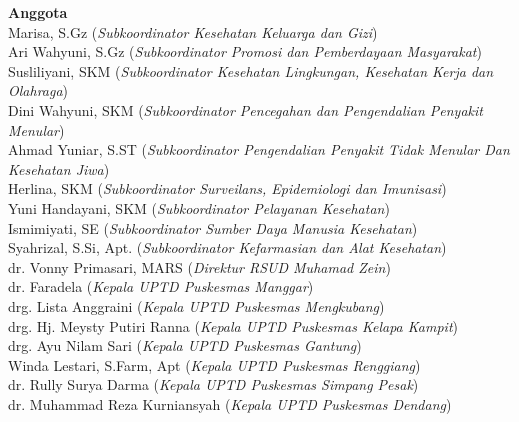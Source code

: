 {\textbf{Anggota}\\
\smallskip
Marisa, S.Gz (\emph{Subkoordinator Kesehatan Keluarga dan Gizi})\\
\smallskip
Ari Wahyuni, S.Gz (\emph{Subkoordinator Promosi dan Pemberdayaan Masyarakat})\\
\smallskip
Susliliyani, SKM (\emph{Subkoordinator Kesehatan Lingkungan, Kesehatan Kerja dan Olahraga})\\
\smallskip
Dini Wahyuni, SKM (\emph{Subkoordinator Pencegahan dan Pengendalian Penyakit Menular})\\
\smallskip
Ahmad Yuniar, S.ST (\emph{Subkoordinator Pengendalian Penyakit Tidak Menular Dan Kesehatan Jiwa})\\
\smallskip
Herlina, SKM (\emph{Subkoordinator Surveilans, Epidemiologi dan Imunisasi})\\
\smallskip
Yuni Handayani, SKM (\emph{Subkoordinator Pelayanan Kesehatan})\\
\smallskip
Ismimiyati, SE (\emph{Subkoordinator Sumber Daya Manusia Kesehatan})\\
\smallskip
Syahrizal, S.Si, Apt. (\emph{Subkoordinator Kefarmasian dan Alat Kesehatan})\\
\smallskip
dr. Vonny Primasari, MARS (\emph{Direktur RSUD Muhamad Zein})\\
\smallskip
dr. Faradela (\emph{Kepala UPTD Puskesmas Manggar})\\
\smallskip
drg. Lista Anggraini (\emph{Kepala UPTD Puskesmas Mengkubang})\\
\smallskip
drg. Hj. Meysty Putiri Ranna (\emph{Kepala UPTD Puskesmas Kelapa Kampit})\\
\smallskip
drg. Ayu Nilam Sari (\emph{Kepala UPTD Puskesmas Gantung})\\
\smallskip
Winda Lestari, S.Farm, Apt (\emph{Kepala UPTD Puskesmas Renggiang})\\
\smallskip
dr. Rully Surya Darma (\emph{Kepala UPTD Puskesmas Simpang Pesak})\\
\smallskip
dr. Muhammad Reza Kurniansyah (\emph{Kepala UPTD Puskesmas Dendang})\\
\bigskip

}
